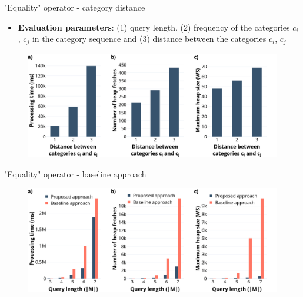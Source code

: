 \documentclass[18pt]{beamer}
\begin{document}
		\begin{frame}{"Equality" operator - category distance}
		
			\begin{itemize}
				\item \textbf{Evaluation parameters}: (1) query length, (2) frequency of the categories $c_i$, $c_j$ in the category sequence and (3) distance between the categories $c_i$, $c_j$
			\end{itemize}
			
			\begin{figure}[h]
				\includegraphics[scale=0.275]{eo_distance.png}
			\end{figure}
		
		\end{frame}
	
		\begin{frame}{"Equality" operator - baseline approach}
			
			\begin{figure}[h]
				\includegraphics[scale=0.275]{eo2.png}
			\end{figure}
		
		\end{frame}
		
\end{document}
